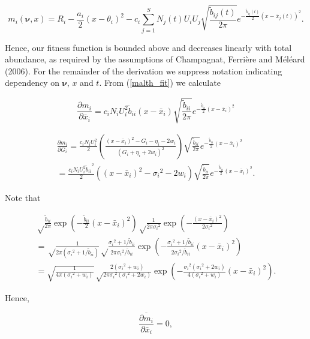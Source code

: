 \documentclass[]{article}
\begin{document}
\begin{equation}\label{malth_fit}
m_i(\pmb\nu,x)=R_i-\frac{a_i}{2}(x-\theta_i)^2-c_i\sum_{j=1}^SN_j(t)U_iU_j\sqrt{\frac{\tilde b_{ij}(t)}{2\pi}}e^{-\frac{\tilde b_{ij}(t)}{2}(x-\bar x_j(t))^2}.
\end{equation}

Hence, our fitness function is bounded above and decreases linearly with
total abundance, as required by the assumptions of Champagnat, Ferrière
and Méléard (2006). For the remainder of the derivation we suppress
notation indicating dependency on \(\pmb\nu\), \(x\) and \(t\). From
(\ref{malth_fit}) we calculate

\begin{equation}
\frac{\partial m_i}{\partial\bar x_i}=c_iN_iU_i^2\tilde b_{ii}(x-\bar x_i)\sqrt{\frac{\tilde b_{ii}}{2\pi}}e^{-\frac{\tilde b_{ii}}{2}(x-\bar x_i)^2}
\end{equation}

\begin{multline}
\frac{\partial m_i}{\partial G_i}=\frac{c_iN_iU_i^2}{2}\left(\frac{(x-\bar x_i)^2-G_i-\eta_i-2w_i}{(G_i+\eta_i+2w_i)^2}\right)\sqrt{\frac{\tilde b_{ii}}{2\pi}}e^{-\frac{\tilde b_{ii}}{2}(x-\bar x_i)^2} \\
=\frac{c_iN_iU_i^2{\tilde b_{ii}}^2}{2}\left((x-\bar x_i)^2-{\sigma_i}^2-2w_i\right)\sqrt{\frac{\tilde b_{ii}}{2\pi}}e^{-\frac{\tilde b_{ii}}{2}(x-\bar x_i)^2}.
\end{multline}

Note that

\begin{multline}
\sqrt\frac{\tilde b_{ii}}{2\pi}\exp\left(-\frac{\tilde b_{ii}}{2}(x-\bar x_i)^2\right)\sqrt\frac{1}{2\pi{\sigma_i}^2}\exp\left(-\frac{(x-\bar x_i)^2}{2{\sigma_i}^2}\right) \\
=\sqrt\frac{1}{2\pi({\sigma_i}^2+1/\tilde b_{ii})}\sqrt\frac{{\sigma_i}^2+1/\tilde b_{ii}}{2\pi{\sigma_i}^2/\tilde b_{ii}}\exp\left(-\frac{{\sigma_i}^2+1/\tilde b_{ii}}{2{\sigma_i}^2/\tilde b_{ii}}(x-\bar x_i)^2\right) \\
=\sqrt{\frac{1}{4\pi({\sigma_i}^2+w_i)}}\sqrt\frac{2({\sigma_i}^2+w_i)}{2\pi{\sigma_i}^2({\sigma_i}^2+2w_i)}\exp\left(-\frac{{\sigma_i}^2({\sigma_i}^2+2w_i)}{4({\sigma_i}^2+w_i)}(x-\bar x_i)^2\right).
\end{multline}

Hence,

\begin{equation}
\overline{\frac{\partial m_i}{\partial\bar x_i}}=0,
\end{equation}
\end{document}
